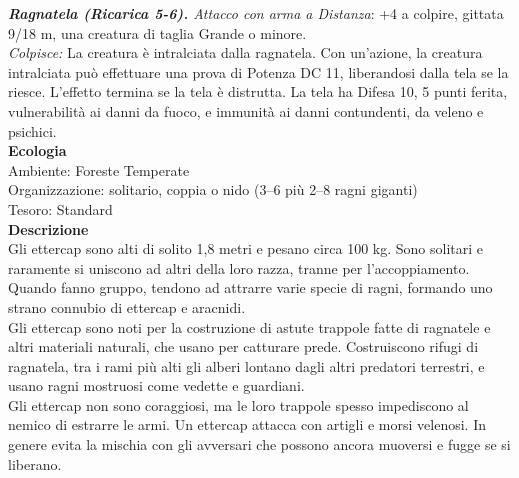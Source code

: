 \begin{multicols}{2}
\emph{\textbf{Ragnatela (Ricarica 5-6).} Attacco con arma a Distanza}: +4 a colpire, gittata 9/18 m, una creatura di taglia Grande o minore.\\
\emph{Colpisce:} La creatura è intralciata dalla ragnatela. Con un'azione, la creatura intralciata può effettuare una prova di Potenza DC 11, liberandosi dalla tela se la riesce. L'effetto termina se la tela è distrutta. La tela ha Difesa 10, 5 punti ferita, vulnerabilità ai danni da fuoco, e immunità ai danni contundenti, da veleno e psichici.\\
\textbf{Ecologia}\\
Ambiente: Foreste Temperate\\
Organizzazione: solitario, coppia o nido (3–6 più 2–8 ragni giganti)\\
Tesoro: Standard\\
\textbf{Descrizione}\\
Gli ettercap sono alti di solito 1,8 metri e pesano circa 100 kg. Sono solitari e raramente si uniscono ad altri della loro razza, tranne per l’accoppiamento. Quando fanno gruppo, tendono ad attrarre varie specie di ragni, formando uno strano connubio di ettercap e aracnidi.\\
Gli ettercap sono noti per la costruzione di astute trappole fatte di ragnatele e altri materiali naturali, che usano per catturare prede. Costruiscono rifugi di ragnatela, tra i rami più alti gli alberi lontano dagli altri predatori terrestri, e usano ragni mostruosi come vedette e guardiani.\\
Gli ettercap non sono coraggiosi, ma le loro trappole spesso impediscono al nemico di estrarre le armi. Un ettercap attacca con artigli e morsi velenosi. In genere evita la mischia con gli avversari che possono ancora muoversi e fugge se si liberano.\\


\end{multicols}
